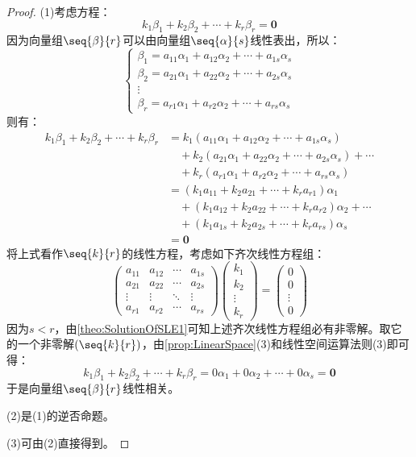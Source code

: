 \begin{proof}
	(1)考虑方程：
	\begin{equation*}
		k_1\beta_1+k_2\beta_2+\cdots+k_r\beta_r=\mathbf{0}
	\end{equation*}
	因为向量组$\seq{\beta}{r}$可以由向量组$\seq{\alpha}{s}$线性表出，所以：
	\begin{equation*}
		\begin{cases}
			\beta_1=a_{11}\alpha_1+a_{12}\alpha_2+\cdots+a_{1s}\alpha_s \\
			\beta_2=a_{21}\alpha_1+a_{22}\alpha_2+\cdots+a_{2s}\alpha_s \\
			\vdots \\
			\beta_r=a_{r1}\alpha_1+a_{r2}\alpha_2+\cdots+a_{rs}\alpha_s
		\end{cases}
	\end{equation*}
	则有：
	\begin{align*}
		k_1\beta_1+k_2\beta_2+\cdots+k_r\beta_r
		&=k_1(a_{11}\alpha_1+a_{12}\alpha_2+\cdots+a_{1s}\alpha_s) \\
		&\quad+k_2(a_{21}\alpha_1+a_{22}\alpha_2+\cdots+a_{2s}\alpha_s)+\cdots \\
		&\quad+k_r(a_{r1}\alpha_1+a_{r2}\alpha_2+\cdots+a_{rs}\alpha_s) \\
		&=(k_1a_{11}+k_2a_{21}+\cdots+k_ra_{r1})\alpha_1 \\
		&\quad+(k_1a_{12}+k_2a_{22}+\cdots+k_ra_{r2})\alpha_2+\cdots \\
		&\quad+(k_1a_{1s}+k_2a_{2s}+\cdots+k_ra_{rs})\alpha_s \\
		&=\mathbf{0}
	\end{align*}
	将上式看作$\seq{k}{r}$的线性方程，考虑如下齐次线性方程组：
	\begin{equation*}
		\begin{pmatrix}
			a_{11} & a_{12} & \cdots & a_{1s} \\
			a_{21} & a_{22} & \cdots & a_{2s} \\
			\vdots & \vdots & \ddots & \vdots \\
			a_{r1} & a_{r2} & \cdots & a_{rs}
		\end{pmatrix}
		\begin{pmatrix}
			k_1 \\
			k_2 \\
			\vdots \\
			k_r
		\end{pmatrix}
		=
		\begin{pmatrix}
			0 \\
			0 \\
			\vdots \\
			0
		\end{pmatrix}
	\end{equation*}
	因为$s<r$，由\cref{theo:SolutionOfSLE1}可知上述齐次线性方程组必有非零解。取它的一个非零解$(\seq{k}{r})$，由\cref{prop:LinearSpace}(3)和线性空间运算法则(3)即可得：
	\begin{equation*}
		k_1\beta_1+k_2\beta_2+\cdots+k_r\beta_r=0\alpha_1+0\alpha_2+\cdots+0\alpha_s=\mathbf{0}
	\end{equation*}
	于是向量组$\seq{\beta}{r}$线性相关。\par
	(2)是(1)的逆否命题。\par
	(3)可由(2)直接得到。
\end{proof}
